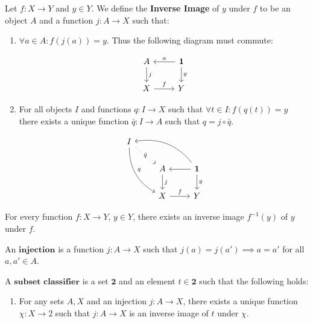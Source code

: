 \begin{definition}[$\dagger$]
Let $f: X \longrightarrow Y$ and $y \in Y$. We define the \textbf{Inverse Image} of $y$ under $f$ to be an object $A$ and a function $j:A \longrightarrow X$ such that:
\begin{enumerate}
\item $\forall a \in A: f(j(a)) = y$. Thus the following diagram must commute:

\begin{equation*}
\begin{tikzcd}
A \arrow[d, "j"]
& \mathbf{1} \arrow[d, "y"] \arrow[l, "a", swap] \\
 X \arrow[r, "f"]
& Y
\end{tikzcd}
\end{equation*}

\item For all objects $I$ and functions $q: I \longrightarrow X$ such that $\forall t \in I: f(q(t)) = y$ there exists a unique function $\bar{q}: I \longrightarrow A$ such that $q = j \circ \bar{q}$.

\begin{equation*}
\begin{tikzcd}
I
\arrow[ddr, bend right, "q"]
\arrow[dr, dotted, "{\bar{q}}" description] & & \\
& A \arrow[d, "j"]
& \mathbf{1} \arrow[d, "y"] \arrow[l, ""]
\arrow[ull, bend right, ""] \\
& X \arrow[r, "f"]
& Y
\end{tikzcd}
\end{equation*}


\end{enumerate}
\end{definition}

\begin{axiom}
For every function $f: X \longrightarrow Y$, $y \in Y$, there exists an inverse image $f^{-1}(y)$ of $y$ under $f$.
\end{axiom}

\begin{definition}[$\dagger$]
An $\textbf{injection}$ is a function $j:A \longrightarrow X$ such that $j(a) = j(a') \implies a = a'$ for all $a,a' \in A$.
\end{definition}

\begin{definition}
A $\textbf{subset classifier}$ is a set $\mathbf{2}$ and an element $t \in \mathbf{2}$ such that the following holds:
\begin{enumerate}
\item For any sets $A,X$ and an injection $j: A \longrightarrow X$, there exists a unique function $\chi: X \longrightarrow 2$ such that $j: A \longrightarrow X$ is an inverse image of $t$ under $\chi$.
\end{enumerate}

\end{definition}


